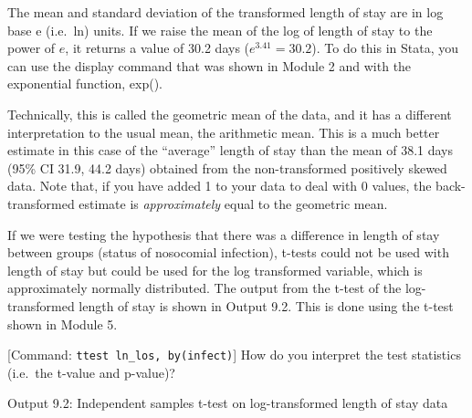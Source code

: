 \documentclass[
]{memoir}
\begin{document}
The mean and standard deviation of the transformed length of stay are in log base e (i.e.~ln) units. If we raise the mean of the log of length of stay to the power of \(e\), it returns a value of 30.2 days (\(e^{3.41}=30.2\)). To do this in Stata, you can use the display command that was shown in Module 2 and with the exponential function, exp().

Technically, this is called the geometric mean of the data, and it has a different interpretation to the usual mean, the arithmetic mean. This is a much better estimate in this case of the ``average'' length of stay than the mean of 38.1 days (95\% CI 31.9, 44.2 days) obtained from the non-transformed positively skewed data. Note that, if you have added 1 to your data to deal with 0 values, the back-transformed estimate is \emph{approximately} equal to the geometric mean.

If we were testing the hypothesis that there was a difference in length of stay between groups (status of nosocomial infection), t-tests could not be used with length of stay but could be used for the log transformed variable, which is approximately normally distributed. The output from the t-test of the log-transformed length of stay is shown in Output 9.2. This is done using the t-test shown in Module 5.

{[}Command: \texttt{ttest\ ln\_los,\ by(infect)}{]} How do you interpret the test statistics (i.e.~the t-value and p-value)?

Output 9.2: Independent samples t-test on log-transformed length of stay data
\end{document}
